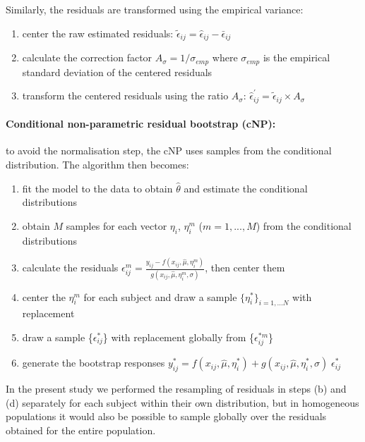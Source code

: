 Similarly, the residuals are transformed using the empirical variance:
\begin{enumerate}
  \item center the raw estimated residuals: $\tilde{\epsilon}_{ij}=\hat{\epsilon}_{ij}-\bar{\epsilon}_{ij}$
  \item calculate the correction factor $A_{\sigma} = 1/\sigma_{emp}$ where $\sigma_{emp}$ is the empirical standard deviation of the centered residuals
  \item transform the centered residuals using the ratio $A_\sigma$: $\hat{\epsilon}_{ij}^{'}=\tilde{\epsilon}_{ij} \times A_\sigma$
\end{enumerate}

\paragraph{Conditional non-parametric residual bootstrap (cNP):} to avoid the normalisation step, the cNP uses samples from the conditional distribution. The algorithm then becomes:

\begin{enumerate} 
  \item fit the model to the data to obtain $\hat{\theta}$ and estimate the conditional distributions
  \item obtain $M$ samples for each vector $\eta_i$, $\eta_{i}^m$ ($m=1,...,M$) from the conditional distributions
  \item calculate the residuals $\epsilon^{m}_{ij} = \frac{y_{ij} - f(x_{ij}, \hat{\mu}, \eta^{m}_{i}) }{g(x_{ij}, \hat{\mu}, \eta^{m}_{i},\sigma)}$, then center them
  \item center the $\eta_{i}^m$ for each subject and draw a sample $\{ \eta^*_i \}_{i=1,...N}$ with replacement 
  \item draw a sample \{$\epsilon^{*}_{ij}$\} with replacement globally from \{$\epsilon^{*m}_{ij}$\} %
  \item generate the bootstrap responses $y^{*}_{ij}=  f(x_{ij}, \hat{\mu}, \eta^*_i) + g(x_{ij}, \hat{\mu}, \eta^*_i, \sigma) \; \epsilon^*_{ij}$
\end{enumerate}
In the present study we performed the resampling of residuals in steps (b) and (d) separately for each subject within their own distribution, but in homogeneous populations it would also be possible to sample globally over the residuals obtained for the entire population.

